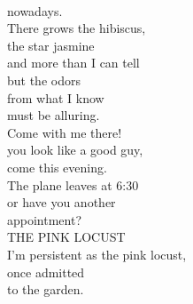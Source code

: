 \documentclass[smalldemyvopaper,11pt,twoside,onecolumn,openright,extrafontsizes]{memoir}
\begin{document}
\\nowadays.
\\There grows the hibiscus,
\\the star jasmine
\\and more than I can tell
\\but the odors
\\from what I know
\\must be alluring.
\\Come with me there!
\\you look like a good guy,
\\come this evening.
\\The plane leaves at 6:30
\\or have you another
\\appointment?
\\THE PINK LOCUST
\\I'm persistent as the pink locust,
\\once admitted
\\to the garden.
\end{document}

